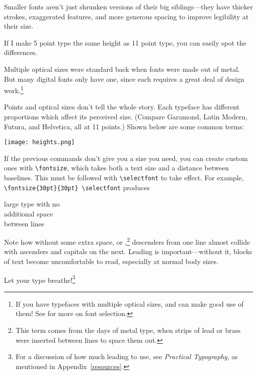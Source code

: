 Smaller fonts aren't just shrunken versions of their big siblings---they
have thicker strokes, exaggerated features,
and more generous spacing to improve legibility at their size.
\begin{leftfigure}
 If I make 5 point type
\lm the same height as 11 point type,
you can easily spot the differences.
\end{leftfigure}
Multiple optical sizes were standard back when fonts were made out of metal.
But many digital fonts only have one,
since each requires a great deal of design work.\punckern\footnote{If
you have typefaces with multiple optical sizes,
\LuaLaTeX{} and \XeLaTeX{} can make good use of them!
See  for more on font selection.}

Points and optical sizes don't tell the whole story.
Each typeface has different proportions which affect its perceived size.
(Compare Garamond, { Latin Modern},
{Futura},
and {Helvetica}, all at 11 points.)
Shown below are some common terms:
\begin{centerfigure}
\texttt{[image: heights.png]}

\end{centerfigure}

If the previous commands don't give you a size you need,
you can create custom ones with \verb|\fontsize|,
which takes both a text size and a
distance between baselines.
This must be followed with \verb|\selectfont| to take effect.
For example, \texttt{\textbackslash fontsize\{30pt\}\allowbreak\{30pt\}%
\allowbreak\textbackslash selectfont}
produces
\begin{leftfigure}
\lm
\fontsize{30pt}{30pt}\selectfont
large type with no \\
additional space \\
between lines
\end{leftfigure}
{\fontsize{11pt}{11pt}\selectfont
Note how without some extra space,
or ,\punckern\footnote{This term comes from the days of
metal type, when strips of lead or brass were inserted
between lines to space them out.\punckern{}}
descenders from one line almost collide with ascenders and capitals on
the next.
Leading is important---without it, blocks of text become uncomfortable to
read, especially at normal body sizes.\par}
Let your type breathe!\footnote{For a discussion of how much leading
to use, see \textit{Practical Typography},
as mentioned in Appendix~\ref{resources}.}

